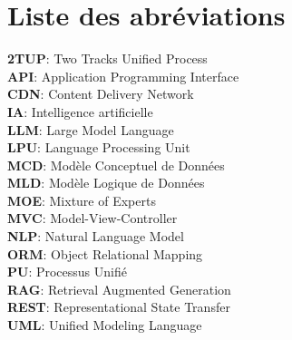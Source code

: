 \thispagestyle{empty}

\chapter*{Liste des abréviations}

\noindent
\vspace{0.5em}
\textbf{2TUP}: Two Tracks Unified Process\\
\vspace{0.5em}
\textbf{API}: Application Programming Interface \\
\vspace{0.5em}
\textbf{CDN}: Content Delivery Network \\
\vspace{0.5em}
\textbf{IA}: Intelligence artificielle\\ 
\vspace{0.5em}
\textbf{LLM}: Large Model Language \\
\vspace{0.5em}
\textbf{LPU}: Language Processing Unit \\
\vspace{0.5em}
\textbf{MCD}: Modèle Conceptuel de Données \\ 
\vspace{0.5em}
\textbf{MLD}: Modèle Logique de Données \\
\vspace{0.5em}
\textbf{MOE}: Mixture of Experts \\
\vspace{0.5em}
\textbf{MVC}: Model-View-Controller \\
\vspace{0.5em}
\textbf{NLP}: Natural Language Model \\
\vspace{0.5em}
\textbf{ORM}: Object Relational Mapping \\
\vspace{0.5em}
\textbf{PU}: Processus Unifié \\
\vspace{0.5em}
\textbf{RAG}: Retrieval Augmented Generation \\
\vspace{0.5em}
\textbf{REST}: Representational State Transfer \\
\vspace{0.5em}
\textbf{UML}: Unified Modeling Language \\
 
